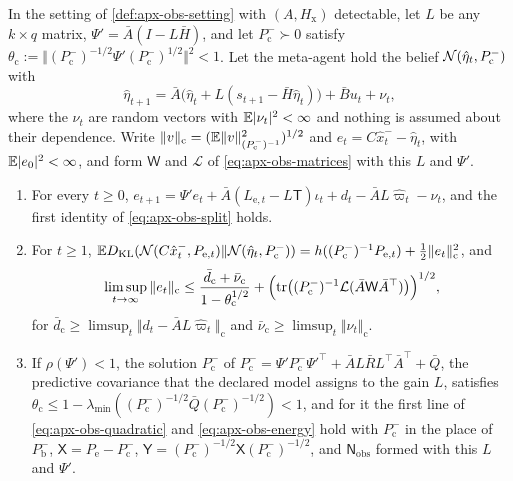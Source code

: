 \begin{proposition}\label{prop:apx-obs-fixed}
In the setting of \cref{def:apx-obs-setting} with $(A,H_{\mathrm x})$ detectable, let $L$ be any $k\times q$ matrix, $\Psi'=\bar A(I-L\bar H)$, and let $P^-_{\mathrm c}\succ0$ satisfy $\theta_{\mathrm c}:=\Vert(P^-_{\mathrm c})^{-1/2}\Psi'(P^-_{\mathrm c})^{1/2}\Vert^2<1$. Let the meta-agent hold the belief $\mathcal{N}(\hat\eta_t,P^-_{\mathrm c})$ with
\begin{equation*}
\hat\eta_{t+1}=\bar A\bigl(\hat\eta_t+L(s_{t+1}-\bar H\hat\eta_t)\bigr)+\bar Bu_t+\nu_t ,
\end{equation*}
where the $\nu_t$ are random vectors with $\mathbb{E}\lvert\nu_t\rvert^2<\infty$ and nothing is assumed about their dependence. Write $\Vert v\Vert_{\mathrm c}=(\mathbb{E}\Vert v\Vert^2_{(P^-_{\mathrm c})^{-1}})^{1/2}$ and $e_t=C\hat x^-_t-\hat\eta_t$, with $\mathbb{E}\lvert e_0\rvert^2<\infty$, and form $\mathsf W$ and $\mathcal L$ of \eqref{eq:apx-obs-matrices} with this $L$ and $\Psi'$.
\begin{enumerate}
\item[(a)] For every $t\ge0$, $e_{t+1}=\Psi'e_t+\bar A(L_{\mathrm e,t}-L\mathsf T)\iota_t+d_t-\bar AL\hat\varpi_t-\nu_t$, and the first identity of \eqref{eq:apx-obs-split} holds.
\item[(b)] For $t\ge1$, $\mathbb{E}D_{\mathrm{KL}}(\mathcal{N}(C\hat x^-_t,P_{\mathrm e,t})\Vert\mathcal{N}(\hat\eta_t,P^-_{\mathrm c}))=h((P^-_{\mathrm c})^{-1}P_{\mathrm e,t})+\frac12\Vert e_t\Vert_{\mathrm c}^2$, and
\begin{equation}\label{eq:apx-obs-fixed}
\limsup_{t\to\infty}\Vert e_t\Vert_{\mathrm c}\le\frac{\bar d_{\mathrm c}+\bar\nu_{\mathrm c}}{1-\theta_{\mathrm c}^{1/2}}+\Bigl(\operatorname{tr}\bigl((P^-_{\mathrm c})^{-1}\mathcal L(\bar A\mathsf W\bar A^\top)\bigr)\Bigr)^{1/2},
\end{equation}
for $\bar d_{\mathrm c}\ge\limsup_t\Vert d_t-\bar AL\hat\varpi_t\Vert_{\mathrm c}$ and $\bar\nu_{\mathrm c}\ge\limsup_t\Vert\nu_t\Vert_{\mathrm c}$.
\item[(c)] If $\rho(\Psi')<1$, the solution $P^-_{\mathrm c}$ of $P^-_{\mathrm c}=\Psi'P^-_{\mathrm c}\Psi'^\top+\bar AL\bar RL^\top\bar A^\top+\bar Q$, the predictive covariance that the declared model assigns to the gain $L$, satisfies $\theta_{\mathrm c}\le1-\lambda_{\min}((P^-_{\mathrm c})^{-1/2}\bar Q(P^-_{\mathrm c})^{-1/2})<1$, and for it the first line of \eqref{eq:apx-obs-quadratic} and \eqref{eq:apx-obs-energy} hold with $P^-_{\mathrm c}$ in the place of $P^-_{\mathrm b}$, $\mathsf X=P_{\mathrm e}-P^-_{\mathrm c}$, $\mathsf Y=(P^-_{\mathrm c})^{-1/2}\mathsf X(P^-_{\mathrm c})^{-1/2}$, and $\mathsf N_{\mathrm{obs}}$ formed with this $L$ and $\Psi'$.
\end{enumerate}
\end{proposition}

